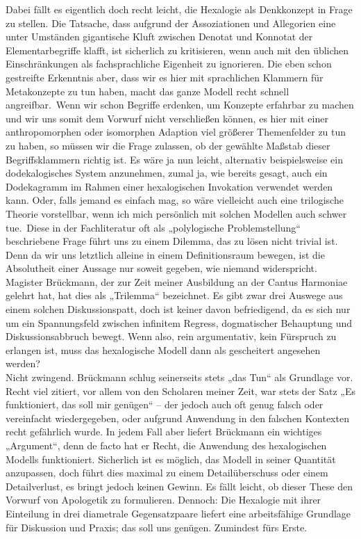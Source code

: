 \documentclass[a5paper,8pt]{book}
\begin{document}
Dabei fällt es eigentlich doch recht leicht, die Hexalogie als Denkkonzept in Frage zu stellen. Die Tatsache, dass aufgrund der Assoziationen und Allegorien eine unter Umständen 
gigantische Kluft zwischen Denotat und Konnotat der Elementarbegriffe klafft, ist sicherlich zu kritisieren, wenn auch mit den üblichen Einschränkungen als fachsprachliche 
Eigenheit zu ignorieren. Die eben schon gestreifte Erkenntnis aber, dass wir es hier mit sprachlichen Klammern für Metakonzepte zu tun haben, macht das ganze Modell recht 
schnell angreifbar.\
Wenn wir schon Begriffe erdenken, um Konzepte erfahrbar zu machen und wir uns somit dem Vorwurf nicht verschließen können, es hier mit einer anthropomorphen oder isomorphen 
Adaption viel größerer Themenfelder zu tun zu haben, so müssen wir die Frage zulassen, ob der gewählte Maßstab dieser Begriffsklammern richtig ist.
Es wäre ja nun leicht, alternativ beispielsweise ein dodekalogisches System anzunehmen, zumal ja, wie bereits gesagt, auch ein Dodekagramm im Rahmen einer hexalogischen 
Invokation verwendet werden kann. Oder, falls jemand es einfach mag, so wäre vielleicht auch eine trilogische Theorie vorstellbar, wenn ich mich persönlich mit solchen 
Modellen auch schwer tue.\
Diese in der Fachliteratur oft als „polylogische Problemstellung“ beschriebene Frage führt uns zu einem Dilemma, das zu lösen nicht trivial ist. Denn da wir uns letztlich 
alleine in einem Definitionsraum bewegen, ist die Absolutheit einer Aussage nur soweit gegeben, wie niemand widerspricht.
Magister Brückmann, der zur Zeit meiner Ausbildung an der Cantus Harmoniae gelehrt hat, hat dies als „Trilemma“ bezeichnet. Es gibt zwar drei Auswege aus einem solchen 
Diskussionspatt, doch ist keiner davon befriedigend, da es sich nur um ein Spannungsfeld zwischen infinitem Regress, dogmatischer Behauptung und Diskussionsabbruch bewegt. 
Wenn also, rein argumentativ, kein Fürspruch zu erlangen ist, muss das hexalogische Modell dann als gescheitert angesehen werden?\\

Nicht zwingend. Brückmann schlug seinerseits stets „das Tun“ als Grundlage vor. Recht viel zitiert, vor allem von den Scholaren meiner Zeit, war stets der Satz „Es funktioniert, 
das soll mir genügen“ – der jedoch auch oft genug falsch oder vereinfacht wiedergegeben, oder aufgrund Anwendung in den falschen Kontexten recht gefährlich wurde.
In jedem Fall aber liefert Brückmann ein wichtiges „Argument“, denn de facto hat er Recht, die Anwendung des hexalogischen Modells funktioniert. Sicherlich ist es möglich, 
das Modell in seiner Quantität anzupassen, doch führt dies maximal zu einem Detailüberschuss oder einem Detailverlust, es bringt jedoch keinen Gewinn.
Es fällt leicht, ob dieser These den Vorwurf von Apologetik zu formulieren. Dennoch: Die Hexalogie mit ihrer Einteilung in drei diametrale Gegensatzpaare liefert eine 
arbeitsfähige Grundlage für Diskussion und Praxis; das soll uns genügen.
Zumindest fürs Erste.\\
\end{document}
